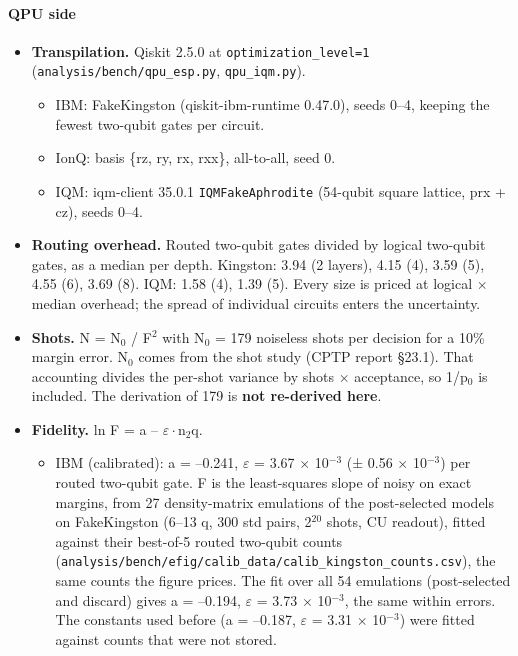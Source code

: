 \paragraph{QPU side}

\begin{itemize}
  \item \textbf{Transpilation.} Qiskit 2.5.0 at \texttt{optimization\_level=1} (\texttt{analysis/bench/qpu\_esp.py}, \texttt{qpu\_iqm.py}).
  \begin{itemize}
    \item IBM: FakeKingston (qiskit-ibm-runtime 0.47.0), seeds 0--4, keeping the fewest two-qubit gates per circuit.
    \item IonQ: basis \{rz, ry, rx, rxx\}, all-to-all, seed 0.
    \item IQM: iqm-client 35.0.1 \texttt{IQMFakeAphrodite} (54-qubit square lattice, prx + cz), seeds 0--4.
  \end{itemize}
  \item \textbf{Routing overhead.} Routed two-qubit gates divided by logical two-qubit gates, as a median per depth. Kingston: 3.94 (2 layers), 4.15 (4), 3.59 (5), 4.55 (6), 3.69 (8). IQM: 1.58 (4), 1.39 (5). Every size is priced at logical $\times$ median overhead; the spread of individual circuits enters the uncertainty.
  \item \textbf{Shots.} N = N$_{0}$ / F$^{2}$ with N$_{0}$ = 179 noiseless shots per decision for a 10\% margin error. N$_{0}$ comes from the shot study (CPTP report §23.1). That accounting divides the per-shot variance by shots $\times$ acceptance, so 1/p$_{0}$ is included. The derivation of 179 is \textbf{not re-derived here}.
  \item \textbf{Fidelity.} ln F = a -- $\varepsilon\cdot$n$_{2}$q.
  \begin{itemize}
    \item IBM (calibrated): a = --0.241, $\varepsilon$ = 3.67 $\times$ 10$^{-3}$ (± 0.56 $\times$ 10$^{-3}$) per routed two-qubit gate. F is the least-squares slope of noisy on exact margins, from 27 density-matrix emulations of the post-selected models on FakeKingston (6--13 q, 300 std pairs, 2$^{20}$ shots, CU readout), fitted against their best-of-5 routed two-qubit counts (\texttt{analysis/bench/efig/calib\_data/calib\_kingston\_counts.csv}), the same counts the figure prices. The fit over all 54 emulations (post-selected and discard) gives a = --0.194, $\varepsilon$ = 3.73 $\times$ 10$^{-3}$, the same within errors. The constants used before (a = --0.187, $\varepsilon$ = 3.31 $\times$ 10$^{-3}$) were fitted against counts that were not stored.

\end{itemize}
\end{itemize}
